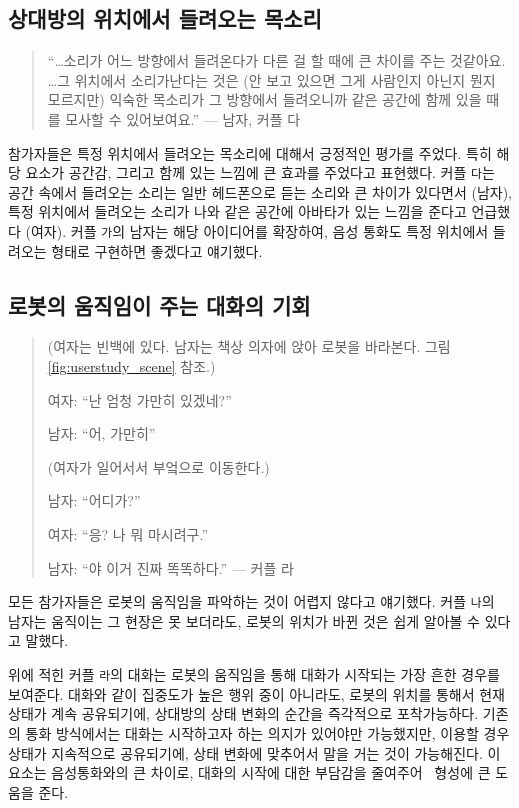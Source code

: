 \subsection{상대방의 위치에서 들려오는 목소리}

\begin{quote}
``\ldots 소리가 어느 방향에서 들려온다가 다른 걸 할 때에 큰 차이를 주는 것같아요. \ldots 그 위치에서 소리가난다는 것은 (안 보고 있으면 그게 사람인지 아닌지 뭔지 모르지만) 익숙한 목소리가 그 방향에서 들려오니까 같은 공간에 함께 있을 때를 모사할 수 있어보여요.'' --- 남자, 커플 다
\end{quote}

참가자들은 특정 위치에서 들려오는 목소리에 대해서 긍정적인 평가를 주었다. 특히 해당 요소가 공간감, 그리고 함께 있는 느낌에 큰 효과를 주었다고 표현했다. 커플 \texttt{다}는 공간 속에서 들려오는 소리는 일반 헤드폰으로 듣는 소리와 큰 차이가 있다면서 (남자), 특정 위치에서 들려오는 소리가 나와 같은 공간에 아바타가 있는 느낌을 준다고 언급했다 (여자). 커플 \texttt{가}의 남자는 해당 아이디어를 확장하여, 음성 통화도 특정 위치에서 들려오는 형태로 구현하면 좋겠다고 얘기했다.



\subsection{로봇의 움직임이 주는 대화의 기회}

\begin{quotation}
(여자는 빈백에 있다. 남자는 책상 의자에 앉아 로봇을 바라본다. 그림 \ref{fig:userstudy_scene} 참조.)

여자: ``난 엄청 가만히 있겠네?''

남자: ``어, 가만히''

(여자가 일어서서 부엌으로 이동한다.)

남자: ``어디가?''

여자: ``응? 나 뭐 마시려구.''

남자: ``야 이거 진짜 똑똑하다.'' --- 커플 라
\end{quotation}

모든 참가자들은 로봇의 움직임을 파악하는 것이 어렵지 않다고 얘기했다. 커플 \texttt{나}의 남자는 움직이는 그 현장은 못 보더라도, 로봇의 위치가 바뀐 것은 쉽게 알아볼 수 있다고 말했다. 

위에 적힌 커플 \texttt{라}의 대화는 로봇의 움직임을 통해 대화가 시작되는 가장 흔한 경우를 보여준다. 대화와 같이 집중도가 높은 행위 중이 아니라도, 로봇의 위치를 통해서 현재 상태가 계속 공유되기에, 상대방의 상태 변화의 순간을 즉각적으로 포착가능하다. 기존의 통화 방식에서는 대화는 시작하고자 하는 의지가 있어야만 가능했지만, \sysname\을 이용할 경우 상태가 지속적으로 공유되기에, 상태 변화에 맞추어서 말을 거는 것이 가능해진다. 이 요소는 음성 통화와의 큰 차이로, 대화의 시작에 대한 부담감을 줄여주어 \concept\ 형성에 큰 도움을 준다.

